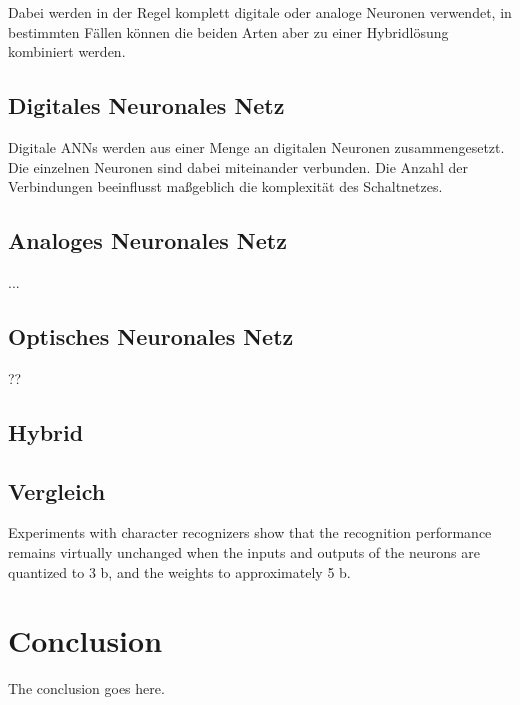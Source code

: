 \documentclass[conference]{IEEEtran}
\begin{document}
    Dabei werden in der Regel komplett digitale oder analoge Neuronen verwendet, in bestimmten Fällen können die beiden Arten aber zu einer Hybridlösung kombiniert werden.


    \subsection{Digitales Neuronales Netz}

    Digitale ANNs werden aus einer Menge an digitalen Neuronen zusammengesetzt.
    Die einzelnen Neuronen sind dabei miteinander verbunden.
    Die Anzahl der Verbindungen beeinflusst maßgeblich die komplexität des Schaltnetzes.


    \subsection{Analoges Neuronales Netz}

    ...

    \subsection{Optisches Neuronales Netz}

    ??

    \subsection{Hybrid}

    \subsection{Vergleich}
    Experiments with character recognizers show that the recognition performance remains virtually unchanged when the inputs and outputs of
    the neurons are quantized to 3 b, and the weights to approximately 5 b. \cite{boser1991analog}



    \section{Conclusion}
    The conclusion goes here.







\end{document}
